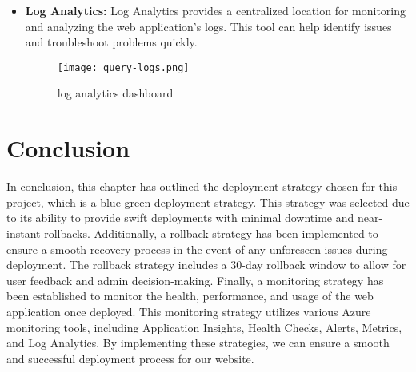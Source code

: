 \begin{itemize}
    \item \textbf{Log Analytics:} Log Analytics provides a centralized location for monitoring and analyzing the web application's logs. This tool can help identify issues and troubleshoot problems quickly.

          \begin{figure}[H]
              \centering
              \texttt{[image: query-logs.png]}
              \caption{log analytics dashboard}
              \label{fig:monitoring-log-analytics}
          \end{figure}

\end{itemize}
\pagebreak
\section*{Conclusion}
In conclusion, this chapter has outlined the deployment strategy chosen for this project, which is a blue-green deployment strategy. This strategy was selected due to its ability to provide swift deployments with minimal downtime and near-instant rollbacks. Additionally, a rollback strategy has been implemented to ensure a smooth recovery process in the event of any unforeseen issues during deployment. The rollback strategy includes a 30-day rollback window to allow for user feedback and admin decision-making. Finally, a monitoring strategy has been established to monitor the health, performance, and usage of the web application once deployed. This monitoring strategy utilizes various Azure monitoring tools, including Application Insights, Health Checks, Alerts, Metrics, and Log Analytics. By implementing these strategies, we can ensure a smooth and successful deployment process for our website.
